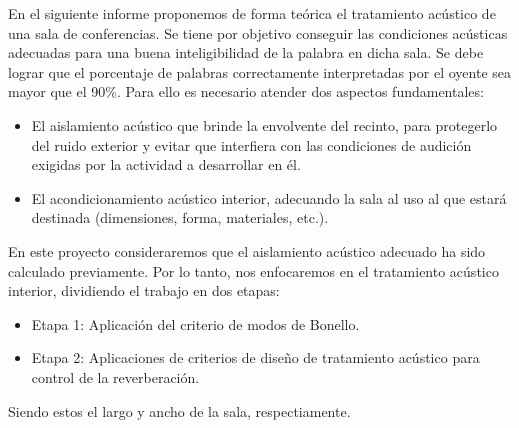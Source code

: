 En el siguiente informe proponemos de forma teórica el tratamiento acústico de una sala de conferencias. Se tiene por objetivo conseguir las condiciones acústicas adecuadas para una buena
inteligibilidad de la palabra en dicha sala. Se debe lograr que el porcentaje de palabras correctamente interpretadas por el oyente sea mayor que el 90\%.
Para ello es necesario atender dos aspectos fundamentales:

\begin{itemize}
\item El aislamiento acústico que brinde la envolvente del recinto, para protegerlo del ruido exterior y evitar que interfiera con las condiciones de audición exigidas por la actividad a desarrollar en él.
\item El acondicionamiento acústico interior, adecuando la sala al uso al que estará destinada (dimensiones, forma, materiales, etc.).

\end{itemize}

En este proyecto consideraremos que el aislamiento acústico adecuado ha sido calculado previamente. Por lo tanto, nos enfocaremos en el tratamiento acústico interior, dividiendo el trabajo en dos etapas:\\

\begin{itemize}
    \item Etapa 1: Aplicación del criterio de modos de Bonello.
    \item Etapa 2: Aplicaciones de criterios de diseño de tratamiento acústico para control de la reverberación.
\end{itemize}


Siendo estos el largo y ancho de la sala, respectiamente.
\hspace{1cm}

